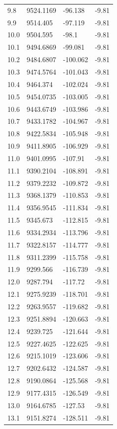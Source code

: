 \begin{table}[H]
\begin{tabular}{llll}
9.8 & 9524.1169 & -96.138 & -9.81 \\
9.9 & 9514.405 & -97.119 & -9.81 \\
10.0 & 9504.595 & -98.1 & -9.81 \\
10.1 & 9494.6869 & -99.081 & -9.81 \\
10.2 & 9484.6807 & -100.062 & -9.81 \\
10.3 & 9474.5764 & -101.043 & -9.81 \\
10.4 & 9464.374 & -102.024 & -9.81 \\
10.5 & 9454.0735 & -103.005 & -9.81 \\
10.6 & 9443.6749 & -103.986 & -9.81 \\
10.7 & 9433.1782 & -104.967 & -9.81 \\
10.8 & 9422.5834 & -105.948 & -9.81 \\
10.9 & 9411.8905 & -106.929 & -9.81 \\
11.0 & 9401.0995 & -107.91 & -9.81 \\
11.1 & 9390.2104 & -108.891 & -9.81 \\
11.2 & 9379.2232 & -109.872 & -9.81 \\
11.3 & 9368.1379 & -110.853 & -9.81 \\
11.4 & 9356.9545 & -111.834 & -9.81 \\
11.5 & 9345.673 & -112.815 & -9.81 \\
11.6 & 9334.2934 & -113.796 & -9.81 \\
11.7 & 9322.8157 & -114.777 & -9.81 \\
11.8 & 9311.2399 & -115.758 & -9.81 \\
11.9 & 9299.566 & -116.739 & -9.81 \\
12.0 & 9287.794 & -117.72 & -9.81 \\
12.1 & 9275.9239 & -118.701 & -9.81 \\
12.2 & 9263.9557 & -119.682 & -9.81 \\
12.3 & 9251.8894 & -120.663 & -9.81 \\
12.4 & 9239.725 & -121.644 & -9.81 \\
12.5 & 9227.4625 & -122.625 & -9.81 \\
12.6 & 9215.1019 & -123.606 & -9.81 \\
12.7 & 9202.6432 & -124.587 & -9.81 \\
12.8 & 9190.0864 & -125.568 & -9.81 \\
12.9 & 9177.4315 & -126.549 & -9.81 \\
13.0 & 9164.6785 & -127.53 & -9.81 \\
13.1 & 9151.8274 & -128.511 & -9.81 \\

\end{tabular}
\end{table}
